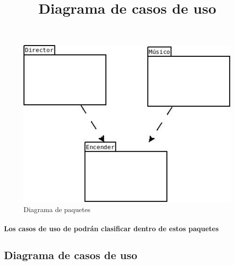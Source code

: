 \begin{figure}[!htb]
\centering
\includegraphics[width=1\textwidth]{./imagenes/diagramapaquetes}
\caption{Diagrama de paquetes} \label{fig:diagramapaquetes}
\end{figure}

\paragraph{Los casos de uso de podrán clasificar dentro de estos paquetes}

\subsection{Diagrama de casos de uso}
\title{Diagrama de casos de uso}
